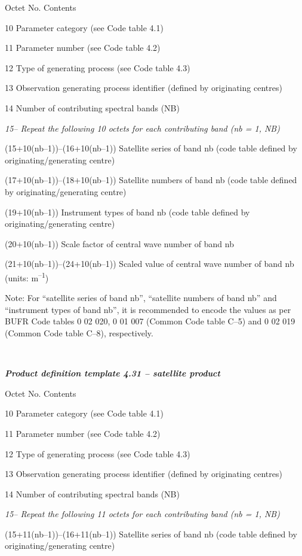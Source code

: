 Octet No. Contents

10 Parameter category (see Code table 4.1)

11 Parameter number (see Code table 4.2)

12 Type of generating process (see Code table 4.3)

13 Observation generating process identifier (defined by originating centres)

14 Number of contributing spectral bands (NB)

\emph{15-- Repeat the following 10 octets for each contributing band (nb = 1, NB)}

(15+10(nb--1))--(16+10(nb--1)) Satellite series of band nb (code table defined by originating/generating centre)

(17+10(nb--1))--(18+10(nb--1)) Satellite numbers of band nb (code table defined by originating/generating centre)

(19+10(nb--1)) Instrument types of band nb (code table defined by originating/generating centre)

(20+10(nb--1)) Scale factor of central wave number of band nb

(21+10(nb--1))--(24+10(nb--1)) Scaled value of central wave number of band nb (units: m\textsuperscript{--1})

Note: For ``satellite series of band nb'', ``satellite numbers of band nb'' and ``instrument types of band nb'', it is recommended to encode the values as per BUFR Code tables 0 02 020, 0 01 007 (Common Code table C--5) and 0 02 019 (Common Code table C--8), respectively.

\emph{\textbf{\\
}}

\emph{\textbf{Product definition template 4.31 -- satellite product}}

Octet No. Contents

10 Parameter category (see Code table 4.1)

11 Parameter number (see Code table 4.2)

12 Type of generating process (see Code table 4.3)

13 Observation generating process identifier (defined by originating centres)

14 Number of contributing spectral bands (NB)

\emph{15-- Repeat the following 11 octets for each contributing band (nb = 1, NB)}

(15+11(nb--1))--(16+11(nb--1)) Satellite series of band nb (code table defined by originating/generating centre)

